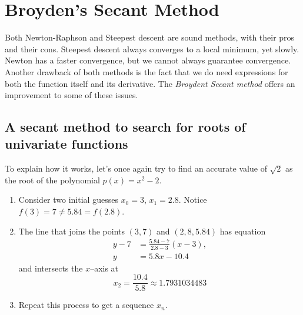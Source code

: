 
\section{Broyden's Secant Method}
Both Newton-Raphson and Steepest descent are sound methods, with their pros and their cons.  Steepest descent always converges to a local minimum, yet slowly.  Newton has a faster convergence, but we cannot always guarantee convergence.  Another drawback of both methods is the fact that we do need expressions for both the function itself and its derivative.  The \emph{Broydent Secant method} offers an improvement to some of these issues.

\subsection{A secant method to search for roots of univariate functions}
To explain how it works, let's once again try to find an accurate value of $\sqrt{2}$ as the root of the polynomial $p(x) = x^2-2$.
\begin{enumerate}
	\item Consider two initial guesses $x_0=3$, $x_1=2.8$.  Notice $f(3)= 7 \neq 5.84 = f(2.8)$.
	\item The line that joins the points $(3, 7)$ and $( 2,8, 5.84)$ has equation
	\begin{align*}
	y - 7 &= \frac{5.84-7}{2.8-3}(x-3), \\ 
	y &= 5.8x-10.4
	\end{align*}
	and intersects the $x$--axis at
	\begin{equation*}
	x_2 = \frac{10.4}{5.8} \approx 1.7931034483
	\end{equation*}
	\item Repeat this process to get a sequence $x_n$.
\end{enumerate}
